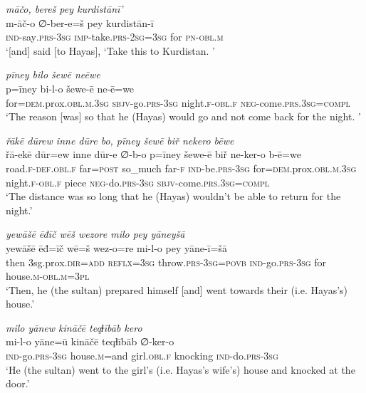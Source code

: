 \ea \label{ŽH.69}
\textit{māčo, bereš pey kurdistānī’} \\ 
\gll m-āč-o ∅-ber-e=š pey kurdistān-ī \\ 
 \textsc{ind-}say\textsc{.prs}\textsc{-3sg} \textsc{imp-}take\textsc{.prs}-\textsc{2sg}\textsc{=3sg} for \textsc{pn}\textsc{-obl}\textsc{.m} \\ 
\glt `[and] said [to Hayas], ‘Take this to Kurdistan. '
\z 
 
\ea \label{ŽH.70}
\textit{pīney bilo šewē neēwe} \\ 
\gll p=īney bi-l-o šewe-ē ne-ē=we \\ 
 for\textsc{=dem}.prox\textsc{.obl}\textsc{.m}\textsc{.3sg} \textsc{sbjv-}go\textsc{.prs}\textsc{-3sg} night\textsc{\textsc{.f}}\textsc{-obl}\textsc{\textsc{.f}} \textsc{neg-}come\textsc{.prs}\textsc{.3sg}\textsc{=compl} \\ 
\glt `The reason [was] so that he (Hayas) would go and not come back for the night. '
\z 
 
\ea \label{ŽH.71}
\textit{řākē dūrew inne dūre bo, pīney šewē biř nekero bēwe} \\ 
\gll řā-ekē dūr=ew inne dūr-e ∅-b-o p=īney šewe-ē biř ne-ker-o b-ē=we \\ 
 road\textsc{\textsc{.f}}\textsc{-def}\textsc{.obl}\textsc{\textsc{.f}} far\textsc{=\textsc{post}} so\_much far\textsc{-f} \textsc{ind-}be\textsc{.prs}\textsc{-3sg} for\textsc{=dem}.prox\textsc{.obl}\textsc{.m}\textsc{.3sg} night\textsc{\textsc{.f}}\textsc{-obl}\textsc{\textsc{.f}} piece \textsc{neg-}do\textsc{.prs}\textsc{-3sg} \textsc{sbjv-}come\textsc{.prs}\textsc{.3sg}\textsc{=compl} \\ 
\glt `The distance was so long that he (Hayas) wouldn’t be able to return for the night.'
\z 
 
\ea \label{ŽH.72}
\textit{yewāšē ēđīč wēš wezore milo pey yāneyšā} \\ 
\gll yewāšē ēđ=īč wē=š wez-o=re mi-l-o pey yāne-ī=šā \\ 
 then 3sg.prox\textsc{.dir}\textsc{=add} \textsc{reflx}\textsc{=3sg} throw\textsc{.prs}\textsc{-3sg}\textsc{=\textsc{povb}} \textsc{ind-}go\textsc{.prs}\textsc{-3sg} for house\textsc{.m}\textsc{-obl}\textsc{.m}\textsc{=3pl} \\ 
\glt `Then, he (the sultan) prepared himself [and] went towards their (i.e. Hayas’s) house.'
\z 
 
\ea \label{ŽH.73}
\textit{milo yānew kināčē teqɫībāb kero} \\ 
\gll mi-l-o yāne=ū kināčē teqɫībāb ∅-ker-o \\ 
 \textsc{ind-}go\textsc{.prs}\textsc{-3sg} house\textsc{.m}=and girl\textsc{.obl}\textsc{\textsc{.f}} knocking \textsc{ind-}do\textsc{.prs}\textsc{-3sg} \\ 
\glt `He (the sultan) went to the girl’s (i.e. Hayas’s wife’s) house and knocked at the door.'
\z 
 
